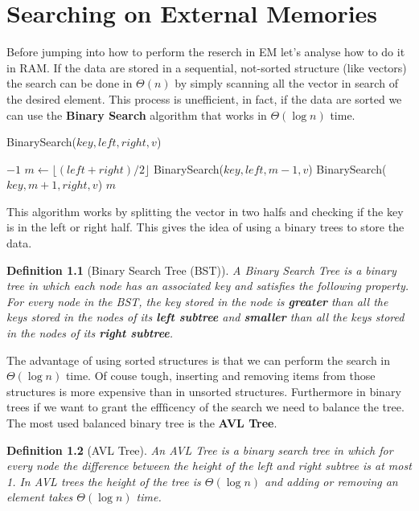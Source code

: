 \documentclass{report}
\newtheorem{defin}{Definition}[chapter]
\begin{document}
\chapter{Searching on External Memories}
Before jumping into how to perform the reserch in EM let's analyse how to do it in RAM.
If the data are stored in a sequential, not-sorted structure (like vectors) the search can be done in \(\Theta(n)\) by simply scanning all the vector in search of the desired element. This process is unefficient, in fact, if the data are sorted we can use the \textbf{Binary Search} algorithm that works in \(\Theta(\log n)\) time.
\begin{algorithm}[H]
    \caption{BinarySearch(\(key, left, right, v\))}
    \begin{algorithmic}[1]
        \State \Return \(-1\)
    \EndIf
    \State \(m \gets \lfloor (left + right) / 2 \rfloor\)
        \State \Return BinarySearch(\(key, left, m - 1, v\))
        \State \Return BinarySearch(\(key, m + 1, right, v\))
    \Else
        \State \Return \(m\)
    \EndIf
    \end{algorithmic}
\end{algorithm}
\noindent
This algorithm works by splitting the vector in two halfs and checking if the key is in the left or right half. This gives the idea of using a binary trees to store the data.
\begin{defin}[Binary Search Tree (BST)]
    A Binary Search Tree is a binary tree in which each node has an associated key and satisfies the following property. For every node in the BST, the key stored in the node is \textbf{greater} than all the keys stored in the nodes of its \textbf{left subtree} and \textbf{smaller} than all the keys stored in the nodes of its \textbf{right subtree}.
\end{defin}
\noindent
The advantage of using sorted structures is that we can perform the search in \(\Theta(\log n)\) time. Of couse tough, inserting and removing items from those structures is more expensive than in unsorted structures. Furthermore in binary trees if we want to grant the effficency of the search we need to balance the tree. The most used balanced binary tree is the \textbf{AVL Tree}.
\begin{defin}[AVL Tree]
    An AVL Tree is a binary search tree in which for every node the difference between the height of the left and right subtree is at most 1. In AVL trees the height of the tree is \(\Theta(\log n)\) and adding or removing an element takes \(\Theta(\log n)\) time.
\end{defin}
\end{document}
